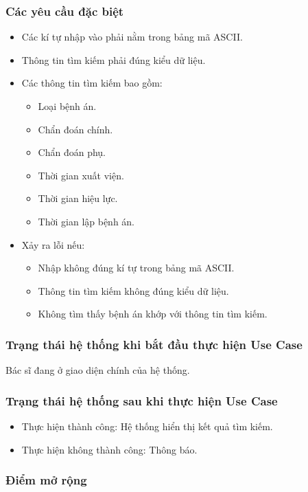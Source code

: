 \subsubsection{Các yêu cầu đặc biệt}
\begin{itemize}
  \item Các kí tự nhập vào phải nằm trong bảng mã ASCII.
  \item Thông tin tìm kiếm phải đúng kiểu dữ liệu.
  \item Các thông tin tìm kiếm bao gồm:
    \begin{itemize}
      \item Loại bệnh án.
      \item Chẩn đoán chính.
      \item Chẩn đoán phụ.
      \item Thời gian xuất viện.
      \item Thời gian hiệu lực.
      \item Thời gian lập bệnh án.
    \end{itemize}
  \item Xảy ra lỗi nếu:
    \begin{itemize}
      \item Nhập không đúng kí tự trong bảng mã ASCII.
      \item Thông tin tìm kiếm không đúng kiểu dữ liệu.
      \item Không tìm thấy bệnh án khớp với thông tin tìm kiếm.
    \end{itemize}
\end{itemize}

\subsubsection{Trạng thái hệ thống khi bắt đầu thực hiện Use Case}
Bác sĩ đang ở giao diện chính của hệ thống.

\subsubsection{Trạng thái hệ thống sau khi thực hiện Use Case}
\begin{itemize}
  \item Thực hiện thành công: Hệ thống hiển thị kết quả tìm kiếm.
  \item Thực hiện không thành công: Thông báo.
\end{itemize}

\subsubsection{Điểm mở rộng}